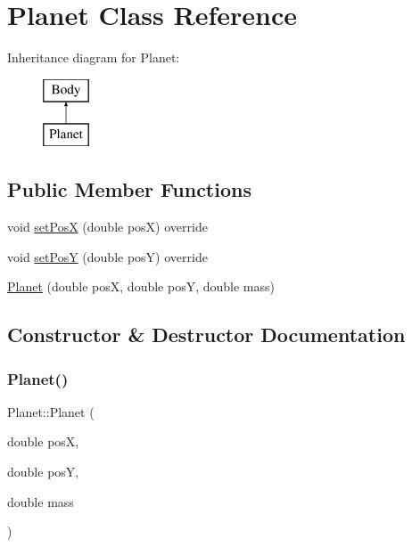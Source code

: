 \hypertarget{class_planet}{}\section{Planet Class Reference}
\label{class_planet}
Inheritance diagram for Planet\+:\begin{figure}[H]
\begin{center}
\leavevmode
\includegraphics[height=2.000000cm]{class_planet}
\end{center}
\end{figure}
\subsection*{Public Member Functions}
\begin{DoxyCompactItemize}
\item 
void \hyperlink{class_planet_af7342d2cef15fb89acde2541c2cc678c}{set\+PosX} (double posX) override
\item 
void \hyperlink{class_planet_afb1d37f2f3ce325133604f40ff59c664}{set\+PosY} (double posY) override
\item 
\hyperlink{class_planet_a1d2c095a5a90bd9f8719deee853fe178}{Planet} (double posX, double posY, double mass)
\end{DoxyCompactItemize}


\subsection{Constructor \& Destructor Documentation}
\mbox{\label{class_planet_a1d2c095a5a90bd9f8719deee853fe178}} 
\subsubsection{\texorpdfstring{Planet()}{Planet()}}
{\footnotesize\ttfamily Planet\+::\+Planet (\begin{DoxyParamCaption}\item[{double}]{posX,  }\item[{double}]{posY,  }\item[{double}]{mass }\end{DoxyParamCaption})}


